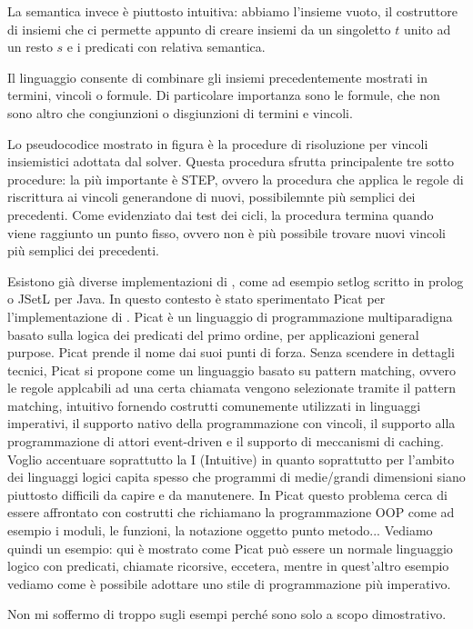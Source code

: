 \documentclass[11pt]{article}
\begin{document}
La semantica invece è piuttosto intuitiva: abbiamo l'insieme vuoto, il
costruttore di insiemi che ci permette appunto di creare insiemi da un
singoletto $t$ unito ad un resto $s$ e i predicati con relativa
semantica.

Il linguaggio consente di combinare gli insiemi precedentemente
mostrati in termini, vincoli o formule. Di particolare importanza sono
le formule, che non sono altro che congiunzioni o disgiunzioni di
termini e vincoli.

Lo pseudocodice mostrato in figura è la procedure di risoluzione per
vincoli insiemistici adottata dal solver. Questa procedura sfrutta
principalente tre sotto procedure: la più importante è STEP, ovvero la
procedura che applica le regole di riscrittura ai vincoli generandone
di nuovi, possibilemnte più semplici dei precedenti.  Come evidenziato
dai test dei cicli, la procedura termina quando viene raggiunto un
punto fisso, ovvero non è più possibile trovare nuovi vincoli più
semplici dei precedenti.

Esistono già diverse implementazioni di \lset{}, come ad esempio
setlog scritto in prolog o JSetL per Java. In questo contesto è stato
sperimentato Picat per l'implementazione di \lset{}. Picat è un
linguaggio di programmazione multiparadigna basato sulla logica dei
predicati del primo ordine, per applicazioni general purpose. Picat
prende il nome dai suoi punti di forza. Senza scendere in dettagli
tecnici, Picat si propone come un linguaggio basato su pattern
matching, ovvero le regole applcabili ad una certa chiamata vengono
selezionate tramite il pattern matching, intuitivo fornendo costrutti
comunemente utilizzati in linguaggi imperativi, il supporto nativo
della programmazione con vincoli, il supporto alla programmazione di
attori event-driven e il supporto di meccanismi di caching.  Voglio
accentuare soprattutto la I (Intuitive) in quanto soprattutto per
l'ambito dei linguaggi logici capita spesso che programmi di
medie/grandi dimensioni siano piuttosto difficili da capire e da
manutenere. In Picat questo problema cerca di essere affrontato con
costrutti che richiamano la programmazione OOP come ad esempio i
moduli, le funzioni, la notazione oggetto punto metodo... Vediamo
quindi un esempio: qui è mostrato come Picat può essere un normale
linguaggio logico con predicati, chiamate ricorsive, eccetera, mentre
in quest'altro esempio vediamo come è possibile adottare uno stile di
programmazione più imperativo.

Non mi soffermo di troppo sugli esempi perché sono solo a scopo
dimostrativo.
\end{document}
